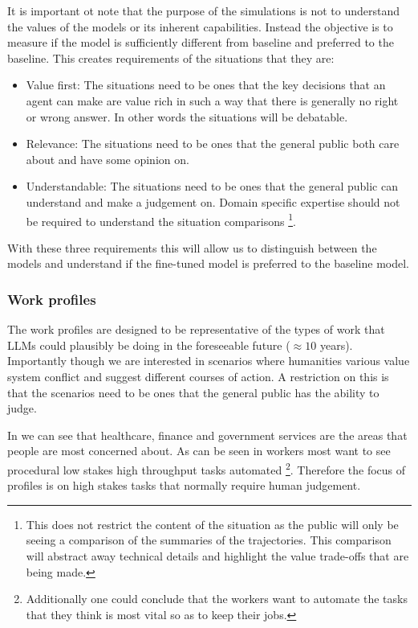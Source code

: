 It is important ot note that the purpose of the simulations is not to understand the values of the models or its inherent capabilities. Instead the objective is to measure if the model is sufficiently different from baseline and preferred to the baseline. This creates requirements of the situations that they are:
\begin{itemize}
    \item Value first: The situations need to be ones that the key decisions that an agent can make are value rich in such a way that there is generally no right or wrong answer. In other words the situations will be debatable.
    \item Relevance: The situations need to be ones that the general public both care about and have some opinion on. 
    \item Understandable: The situations need to be ones that the general public can understand and make a judgement on. Domain specific expertise should not be required to understand the situation comparisons \footnote{This does not restrict the content of the situation as the public will only be seeing a comparison of the summaries of the trajectories. This comparison will abstract away technical details and highlight the value trade-offs that are being made.}.
\end{itemize}

With these three requirements this will allow us to distinguish between the models and understand if the fine-tuned model is preferred to the baseline model.

\subsubsection{Work profiles}

The work profiles are designed to be representative of the types of work that LLMs could plausibly be doing in the foreseeable future ($\approx 10$ years). Importantly though we are interested in scenarios where humanities various value system conflict and suggest different courses of action. A restriction on this is that the scenarios need to be ones that the general public has the ability to judge.

In \cite{Aitrustreport2025onenz,GlobalAttitudesAI2026} we can see that healthcare, finance and government services are the areas that people are most concerned about. As can be seen in \cite{shaoFutureWorkAI2026} workers most want to see procedural low stakes high throughput tasks automated \footnote{Additionally one could conclude that the workers want to automate the tasks that they think is most vital so as to keep their jobs.}. Therefore the focus of profiles is on high stakes tasks that normally require human judgement.

